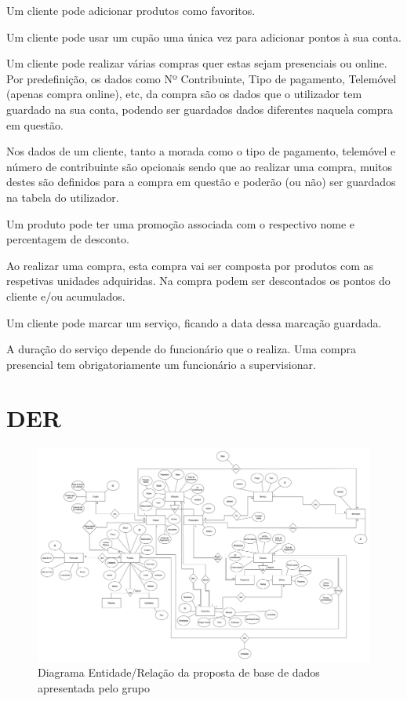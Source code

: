 \documentclass[10pt,portuguese]{article}
\begin{document}
\par Um cliente pode adicionar produtos como favoritos.
\par Um cliente pode usar um cupão uma única vez para adicionar pontos à sua conta.
\par Um cliente pode realizar várias compras quer estas sejam presenciais ou online. Por predefinição, os dados como Nº Contribuinte, Tipo de pagamento, Telemóvel (apenas compra online), etc, da compra são os dados que o utilizador tem guardado na sua conta, podendo ser guardados dados diferentes naquela compra em questão.
\par Nos dados de um cliente, tanto a morada como o tipo de pagamento, telemóvel e número de contribuinte são opcionais sendo que ao realizar uma compra, muitos destes são definidos para a compra em questão e poderão (ou não) ser guardados na tabela do utilizador.
\par Um produto pode ter uma promoção associada com o respectivo nome e percentagem de desconto.
\par Ao realizar uma compra, esta compra vai ser composta por produtos com as respetivas unidades adquiridas. Na compra podem ser descontados os pontos do cliente e/ou acumulados.
\par Um cliente pode marcar um serviço, ficando a data dessa marcação guardada.
\par A duração do serviço depende do funcionário que o realiza.
Uma compra presencial tem obrigatoriamente um funcionário a supervisionar.

\clearpage

\section{DER}

\begin{figure}[!h]
    \centering
    \includegraphics[width=\textwidth]{images/DER.png}
    \caption{Diagrama Entidade/Relação da proposta de base de dados apresentada pelo grupo}
\end{figure}
\end{document}
